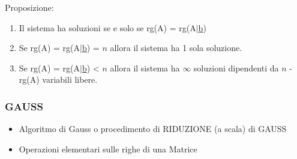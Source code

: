 \flushleft\textsf{\small Proposizione:} \\
\centering
\begin{enumerate}
	\item \textsf{\small Il sistema ha soluzioni se e solo se rg(A) = rg(A$\mid$\underline{b})}
	\item \textsf{\small Se rg(A) = rg(A$\mid$\underline{b}) = $n$ allora il sistema ha 1 sola soluzione.}
	\item \textsf{\small Se rg(A) = rg(A$\mid$\underline{b}) < $n$ allora il sistema ha $\infty$ soluzioni dipendenti da $n$ - rg(A) variabili libere.}
\end{enumerate}

\newpage

\subsubsection{GAUSS}

\begin{itemize}
	\item \textsf{\small Algoritmo di Gauss o procedimento di RIDUZIONE (a scala) di GAUSS}
	\item \textsf{\small Operazioni elementari sulle righe di una Matrice}
\end{itemize}

